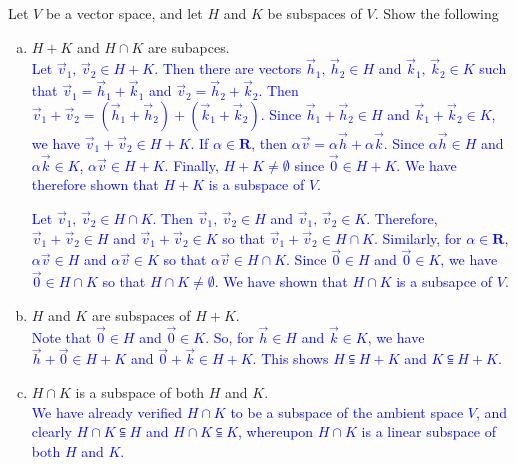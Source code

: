 \documentclass[a4paper,11pt]{article}
\newcommand{\R}{\mathbf{R}}
\newcommand{\BB}[1]{\textcolor{blue}{#1}}
\begin{document}
 Let $V$ be a vector space, and let $H$ and $K$ be
subspaces of $V$. Show the following
\begin{enumerate}[(a)]
\item $H+K$ and $H \cap K$ are subapces. \\

  \BB{Let $\vec v_1,\,\vec v_2 \in H+K$. Then there are vectors $\vec h_1,\,\vec
    h_2 \in H$ and $\vec k_1,\,\vec k_2 \in K$ such that $\vec v_1=\vec h_1+\vec
    k_1$ and $\vec v_2=\vec h_2+\vec k_2$. Then $\vec v_1 + \vec v_2 = (\vec
    h_1+\vec h_2)+(\vec k_1+\vec k_2)$. Since $\vec h_1+\vec h_2 \in H$ and
    $\vec k_1+\vec k_2 \in K$, we have $\vec v_1 + \vec v_2 \in H+K$. If $\alpha
    \in \R$, then $\alpha\vec v = \alpha\vec h + \alpha\vec k$. Since
    $\alpha\vec h \in H$ and $\alpha\vec k \in K$, $\alpha\vec v \in H+K$.
    Finally, $H+K \neq \emptyset$ since $\vec 0 \in H+K$. We have therefore
    shown that $H+K$ is a subspace of $V.$}

  \BB{Let $\vec v_1,\,\vec v_2 \in H \cap K$. Then $\vec v_1,\,\vec v_2 \in H$
    and $\vec v_1,\,\vec v_2 \in K$. Therefore, $\vec v_1+\vec v_2 \in H$ and
    $\vec v_1+\vec v_2 \in K$ so that $\vec v_1+\vec v_2 \in H \cap K$.
    Similarly, for $\alpha \in \R$, $\alpha\vec v \in H$ and $\alpha\vec v \in
    K$ so that $\alpha\vec v \in H \cap K$. Since $\vec 0 \in H$ and $\vec 0 \in
    K$, we have $\vec 0 \in H \cap K$ so that $H \cap K \neq \emptyset$. We have
    shown that $H \cap K$ is a subsapce of $V$. \\}
  
\item $H$ and $K$ are subspaces of $H+K$. \\

  \BB{Note that $\vec 0 \in H$ and $\vec 0 \in K$. So, for $\vec h \in H$ and
    $\vec k \in K$, we have $\vec h + \vec 0 \in H+K$ and $\vec 0 +\vec k \in
    H+K$. This shows $H \subseteqq H+K$ and $K \subseteqq H+K$. \\}
  
\item $H \cap K$ is a subspace of both $H$ and $K$. \\

  \BB{We have already verified $H \cap K$ to be a subspace of the ambient space
    $V$, and clearly $H \cap K \subseteqq H$ and $H \cap K \subseteqq K$,
    whereupon $H \cap K$ is a linear subspace of both $H$ and $K$. \\}
\end{enumerate}
\end{document}

